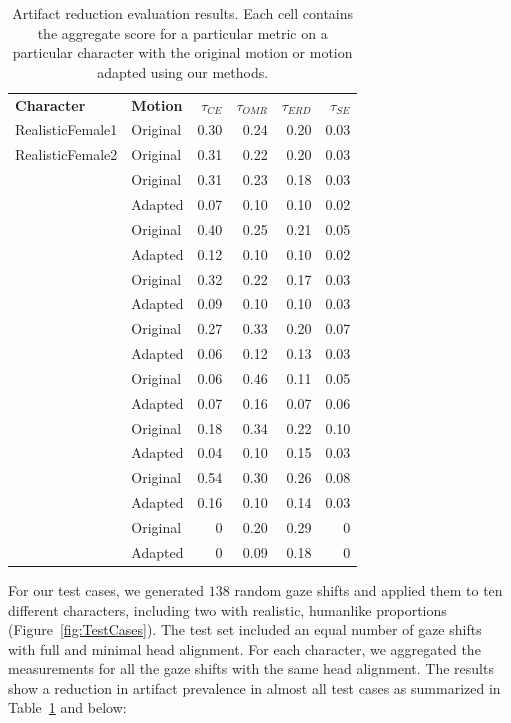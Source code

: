 \begin{table}
\centering
\def\arraystretch{1.5}
\begin{tabular}{|l|l|r|r|r|r|}
\hline
\textbf{Character} & \textbf{Motion} & $\tau_{CE}$ & $\tau_{OMR}$ & $\tau_{ERD}$ & $\tau_{SE}$ \\
\Xhline{2\arrayrulewidth}
RealisticFemale1 & Original & 0.30 & 0.24 & 0.20 & 0.03 \\
\hdashline
RealisticFemale2 & Original & 0.31 & 0.22 & 0.20 & 0.03 \\
\hdashline
\multirow{2}{*}{SemiStylizedFemale} & Original & 0.31 & 0.23 & 0.18 & 0.03 \\
& Adapted & 0.07 & 0.10 & 0.10 & 0.02 \\
\hdashline
\multirow{2}{*}{StylizedFemale} & Original & 0.40 & 0.25 & 0.21 & 0.05 \\
& Adapted & 0.12 & 0.10 & 0.10 & 0.02 \\
\hdashline
\multirow{2}{*}{StylizedMale} & Original & 0.32 & 0.22 & 0.17 & 0.03 \\
& Adapted & 0.09 & 0.10 & 0.10 & 0.03 \\
\hdashline
\multirow{2}{*}{EmotiGuy} & Original & 0.27 & 0.33 & 0.20 & 0.07 \\
& Adapted & 0.06 & 0.12 & 0.13 & 0.03 \\
\hdashline
\multirow{2}{*}{Jack} & Original & 0.06 & 0.46 & 0.11 & 0.05 \\
& Adapted & 0.07 & 0.16 & 0.07 & 0.06 \\
\hdashline
\multirow{2}{*}{Donkey} & Original & 0.18 & 0.34 & 0.22 & 0.10 \\
& Adapted & 0.04 & 0.10 & 0.15 & 0.03 \\
\hdashline
\multirow{2}{*}{Fish} & Original & 0.54 & 0.30 & 0.26 & 0.08 \\
& Adapted & 0.16 & 0.10 & 0.14 & 0.03 \\
\hdashline
\multirow{2}{*}{NastyMonster} & Original & 0 & 0.20 & 0.29 & 0 \\
& Adapted & 0 & 0.09 & 0.18 & 0 \\
\hline
\end{tabular}
\caption{Artifact reduction evaluation results. Each cell contains the aggregate score for a particular metric on a particular character with the original motion or motion adapted using our methods.}
\label{tab:EvalResults}
\end{table}

For our test cases, we generated $138$ random gaze shifts and applied them to ten different characters, including two with realistic, humanlike proportions (Figure~\ref{fig:TestCases}). The test set included an equal number of gaze shifts with full and minimal head alignment. For each character, we aggregated the measurements for all the gaze shifts with the same head alignment. The results show a reduction in artifact prevalence in almost all test cases as summarized in Table~\ref{tab:EvalResults} and below:

